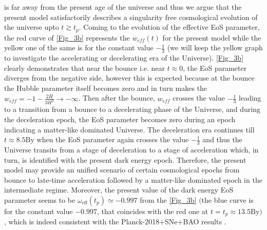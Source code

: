 \documentclass{article}
\begin{document}
 is far away from the present age of the universe and thus we argue that the present model satisfactorily describes a singularity free cosmological 
 evolution of the universe upto $t \gtrsim t_p$. Coming to the evolution of the effective EoS parameter, 
 the red curve of \ref{Fig_3b} represents the $w_{eff}(t)$ for the present model while the yellow one of the same is for the constant 
 value $-\frac{1}{3}$ (we will keep the yellow graph to investigate the accelerating or decelerating era of the Universe). 
 \ref{Fig_3b} clearly demonstrates that near the bounce i.e. near $t \approx 0$, the EoS parameter diverges from the negative side, 
 however this is expected because at the bounce the Hubble 
 parameter itself becomes zero and in turn makes the $w_{eff} = -1 - \frac{2\dot{H}}{3H^2} \rightarrow -\infty$. Then after the bounce, 
 $w_{eff}$ crosses the value $-\frac{1}{3}$ leading to a transition 
 from a bounce to a decelerating phase of the Universe, and during the deceleration epoch, the EoS parameter becomes zero during an epoch 
 indicating a matter-like dominated Universe. The deceleration era continues till $t \approx 8.5\mathrm{By}$ 
 when the EoS parameter again crosses the value $-\frac{1}{3}$ and thus the 
 Universe transits from a stage of deceleration to a stage of acceleration which, in turn, is identified with the present dark energy epoch. 
 Therefore, the present model may provide an unified scenario of certain cosmological epochs from bounce to late-time acceleration followed 
 by a matter-like dominated epoch in the intermediate regime. Moreover, the present value of the dark energy EoS parameter seems to be 
 $\omega_\mathrm{eff}(t_p) \simeq -0.997$ from the \ref{Fig_3b} $\big($the blue curve is for the constant value $-0.997$, that coincides with the 
 red one at $t = t_p \approx 13.5\mathrm{By}\big)$, which is indeed consistent with the Planck-2018+SNe+BAO results \cite{Aghanim:2018eyx}.
 
\end{document}
